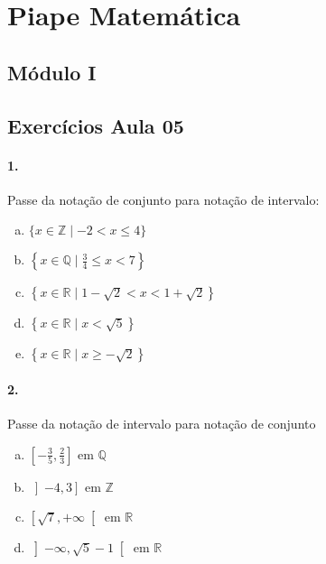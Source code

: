 \documentclass[a4paper,twocolumn,12pt]{article}
\begin{document}
 
\section*{Piape Matemática} 
 
\subsection*{Módulo I}
\subsection*{Exercícios Aula 05}

\paragraph{1.} Passe da notação de conjunto para notação de intervalo:
\begin{enumerate}[a)]
\item $\{x \in \mathbb{Z} \mid -2 < x \leq 4\}$
\item $\left\{x \in \mathbb{Q} \mid \frac{3}{4} \leq x < 7\right\}$
\item $\left\{x \in \mathbb{R} \mid 1-\sqrt{2} < x < 1+\sqrt{2}\right\}$
\item $\left\{x \in \mathbb{R} \mid x < \sqrt{5}\right\}$
\item $\left\{x \in \mathbb{R} \mid x \geq -\sqrt{2}\right\}$
\end{enumerate}

\paragraph*{2. } Passe da notação de intervalo para notação de conjunto 
\begin{enumerate}[a)]
  \item $\left[-\frac{3}{5},\frac{2}{3}\right]$ em $\mathbb{Q}$
  \item $\left]-4,3\right]$ em $\mathbb{Z}$
  \item $\left[\sqrt{7},+\infty\right[$ em $\mathbb{R}$
  \item $\left]-\infty, \sqrt{5}-1\right[$ em $\mathbb{R}$
\end{enumerate} 

\newpage
\end{document}
